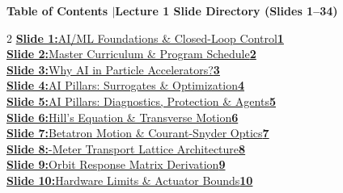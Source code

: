 \documentclass[11pt,a4paper]{article}
\begin{document}
\clearpage
{}

\noindent\begin{tcolorbox}[colback=navy,colframe=navy,left=8pt,right=8pt,top=4pt,bottom=4pt,boxrule=0pt,arc=2pt]
{\large\bfseries\color{white}Table of Contents \enspace$|$\enspace Lecture 1 Slide Directory (Slides 1--34)}
\end{tcolorbox}
\vspace{0.4em}

{\footnotesize
\begin{multicols}{2}
\noindent\hyperlink{slide.1}{\textbf{\color{primaryblue}Slide 1:}\enspace AI/ML Foundations \& Closed-Loop Control\enspace\dotfill\enspace\textbf{1}} \\[0.22em]
\noindent\hyperlink{slide.2}{\textbf{\color{primaryblue}Slide 2:}\enspace Master Curriculum \& Program Schedule\enspace\dotfill\enspace\textbf{2}} \\[0.22em]
\noindent\hyperlink{slide.3}{\textbf{\color{primaryblue}Slide 3:}\enspace Why AI in Particle Accelerators?\enspace\dotfill\enspace\textbf{3}} \\[0.22em]
\noindent\hyperlink{slide.4}{\textbf{\color{primaryblue}Slide 4:}\enspace AI Pillars: Surrogates \& Optimization\enspace\dotfill\enspace\textbf{4}} \\[0.22em]
\noindent\hyperlink{slide.5}{\textbf{\color{primaryblue}Slide 5:}\enspace AI Pillars: Diagnostics, Protection \& Agents\enspace\dotfill\enspace\textbf{5}} \\[0.22em]
\noindent\hyperlink{slide.6}{\textbf{\color{primaryblue}Slide 6:}\enspace Hill's Equation \& Transverse Motion\enspace\dotfill\enspace\textbf{6}} \\[0.22em]
\noindent\hyperlink{slide.7}{\textbf{\color{primaryblue}Slide 7:}\enspace Betatron Motion \& Courant-Snyder Optics\enspace\dotfill\enspace\textbf{7}} \\[0.22em]
\noindent\hyperlink{slide.8}{\textbf{\color{primaryblue}Slide 8:}-Meter Transport Lattice Architecture\enspace\dotfill\enspace\textbf{8}} \\[0.22em]
\noindent\hyperlink{slide.9}{\textbf{\color{primaryblue}Slide 9:}\enspace Orbit Response Matrix Derivation\enspace\dotfill\enspace\textbf{9}} \\[0.22em]
\noindent\hyperlink{slide.10}{\textbf{\color{primaryblue}Slide 10:}\enspace Hardware Limits \& Actuator Bounds\enspace\dotfill\enspace\textbf{10}} \\[0.22em]

\end{multicols}}
\end{document}
